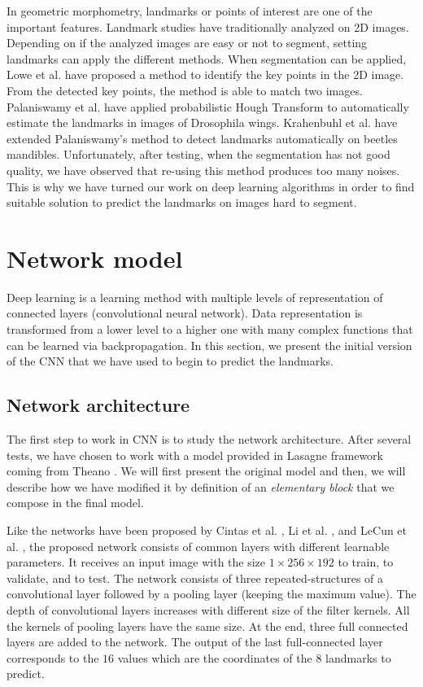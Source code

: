 \documentclass[10pt]{article}
\begin{document}
In geometric morphometry, landmarks or points of interest are one of
the important features. Landmark studies have traditionally
analyzed on 2D images. Depending on if the analyzed images are
easy or not to segment, setting landmarks can apply
the different methods. When segmentation can be applied, Lowe et
al. \cite{lowe2004distinctive} have proposed a method to identify the
key points in the 2D image. From the detected key points, the method
is able to match two images. Palaniswamy et
al. \cite{palaniswamy2010automatic} have applied probabilistic Hough
Transform to automatically estimate the landmarks in images of
Drosophila wings. Krahenbuhl et al. \cite{le2017maelab} have extended
Palaniswamy's method to detect landmarks automatically on beetles
mandibles. Unfortunately, after testing, when the segmentation has not good quality,
we have observed that re-using this method produces too many
noises. This is why we have turned our work on deep learning
algorithms in order to find suitable solution to predict the landmarks
on images hard to segment.


\section{Network model}
Deep learning is a learning method with multiple levels of
representation of connected layers (convolutional neural
network). Data representation is transformed from a lower level to a
higher one with many complex functions that can be learned via
backpropagation. In this section, we present the initial version of the CNN that we have used
to begin to predict the landmarks. 

\subsection{Network architecture}
\label{secmodel}
The first step to work in CNN is to study the network
architecture. After several tests, we have chosen to work with a model provided in Lasagne framework \cite{lasagne} coming from
Theano \cite{2016arXiv160502688short}. We will first present the
original model and then, we will describe how we have modified it by definition of an
\textit{elementary block} that we compose in the final model.

Like the networks have been proposed by Cintas et al. \cite{cintas2016automatic}, Li et al. \cite{li2015convolutional}, and  LeCun et al. \cite{lecun2010convolutional}, the proposed network consists of common layers
with different learnable parameters. It receives an input image with
the size  $1 \times 256 \times 192$ to train, to validate, and to
test. The network consists of three repeated-structures of a convolutional layer
followed by a pooling layer (keeping the maximum value). The depth of convolutional layers increases with different size of the filter kernels.
All the kernels of pooling layers have the same size. 
At the end, three full connected layers are added to the
network. The output of the last full-connected
layer corresponds to the $16$ values which are the coordinates of the
$8$ landmarks to predict.
\end{document}
